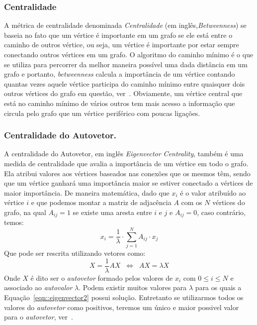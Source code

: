 \subsubsection{Centralidade}
\label{subsubsection::constraint}
A métrica de centralidade denominada \textit{Centralidade} (em inglês,\textit{Betweenness}) se baseia no fato que um vértice é importante em um grafo se ele está entre o caminho de outros vértice, ou seja, um vértice é importante por estar sempre conectando outros vértices em um grafo. O algoritmo do caminho mínimo é o que se utiliza para percorrer da melhor maneira possível uma dada distância em um grafo e portanto, \textit{betweenness} calcula a importância de um vértice contando quantas vezes aquele vértice participa do caminho mínimo entre quaisquer dois outros vértices do grafo em questão, ver~\cite{Sabidussi66}. Obviamente, um vértice central que está no caminho mínimo de vários outros tem mais acesso a informação que circula pelo grafo que um vértice periférico com poucas ligações.

\subsubsection{Centralidade do Autovetor.}
\label{subsubsection::eigenvector}
A centralidade do Autovetor, em inglês \textit{Eigenvector Centrality}, também é uma medida de centralidade que avalia a importância de um vértice em todo o grafo. Ela atribui valores aos vértices baseados nas conexões que os mesmos têm, sendo que um vértice ganhará uma importância maior se estiver conectado a vértices de maior importância. De maneira matemática, dado que $x_i$ é o valor atribuído ao vértice $i$ e que podemos montar a matriz de adjacência $A$ com os $N$ vértices do grafo, na qual $A_{ij} = 1$ se existe uma aresta entre $i$ e $j$ e $A_{ij}=0$, caso contrário, temos:
\begin{equation}\label{eqn::eigenvector1}
   x_i = \frac{1}{\lambda} \cdot \sum\limits_{j=1}^{N} A_{ij} \cdot x_j
\end{equation}
Que pode ser rescrita utilizando vetores como:
\begin{equation}\label{eqn::eigenvector2}
   X = \frac{1}{\lambda} AX  \;\; \Longleftrightarrow\;\;  AX = \lambda X
\end{equation}
Onde $X$ é dito ser o \textit{autovetor} formado pelos valores de $x_i$ com $0 \leq i \leq N$ e associado ao \textit{autovalor} $\lambda$.  Podem existir muitos valores para $\lambda$ para os quais a Equação~\ref{eqn::eigenvector2} possui solução. Entretanto se utilizarmos todos os valores do \textit{autovetor} como positivos, teremos um único e maior possivel valor para o \textit{autovetor}, ver~\cite{Newman10}. 

